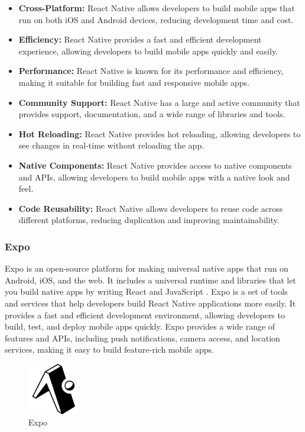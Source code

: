 \begin{itemize}
    \item \textbf{Cross-Platform:} React Native allows developers to build mobile apps that run on both iOS and Android devices, reducing development time and cost.
    \item \textbf{Efficiency:} React Native provides a fast and efficient development experience, allowing developers to build mobile apps quickly and easily.
    \item \textbf{Performance:} React Native is known for its performance and efficiency, making it suitable for building fast and responsive mobile apps.
    \item \textbf{Community Support:} React Native has a large and active community that provides support, documentation, and a wide range of libraries and tools.
    \item \textbf{Hot Reloading:} React Native provides hot reloading, allowing developers to see changes in real-time without reloading the app.
    \item \textbf{Native Components:} React Native provides access to native components and APIs, allowing developers to build mobile apps with a native look and feel.
    \item \textbf{Code Reusability:} React Native allows developers to reuse code across different platforms, reducing duplication and improving maintainability.
\end{itemize}

\subsubsection{Expo}
Expo is an open-source platform for making universal native apps that run on Android, iOS, and the web. It includes a universal runtime and libraries that let you build native apps by writing React and JavaScript \cite{expo}. Expo is a set of tools and services that help developers build React Native applications more easily. It provides a fast and efficient development environment, allowing developers to build, test, and deploy mobile apps quickly. Expo provides a wide range of features and APIs, including push notifications, camera access, and location services, making it easy to build feature-rich mobile apps.

\begin{figure}[H]
    \centering
    \includegraphics[width=0.2\textwidth]{Images/expo.png}
    \caption{Expo}
    \label{fig:expo}
\end{figure}


